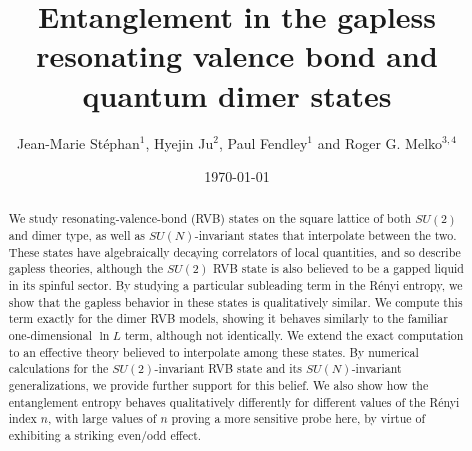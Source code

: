 \documentclass[11pt]{iopart}
\begin{document}
 
\title[Entanglement in RVB and quantum dimer states]{Entanglement in the gapless resonating valence bond and quantum dimer states}
 
\author{Jean-Marie St\'ephan$^1$, Hyejin Ju$^2$, Paul Fendley$^1$ and Roger G. Melko$^{3,4}$}

\address{$^1$ Physics Department, University of Virginia, Charlottesville, VA 22904-4714}

\address{$^2$ Department of Physics, University of California, Santa Barbara, CA, 93106-9530}

\address{$^3$ Department of Physics and Astronomy, University of Waterloo, Ontario, N2L 3G1, Canada}

\address{$^4$ Perimeter Institute for Theoretical Physics, Waterloo, Ontario N2L 2Y5, Canada}



\date{\today}
\begin{abstract}

We study resonating-valence-bond (RVB) states on the square lattice of both $SU(2)$ and dimer type,  as well as $SU(N)$-invariant states that interpolate between the two. These states have algebraically decaying correlators of local quantities, and so describe gapless theories, although the $SU(2)$ RVB state is also believed to be a gapped liquid in its spinful sector. By studying a particular subleading term in the R\'enyi entropy, we show that the gapless behavior in these states is qualitatively similar. We compute this term exactly for the dimer RVB models, showing it behaves similarly to the familiar one-dimensional $\ln L$ term, although not identically. We extend the exact computation to an effective theory believed to interpolate among these states. By numerical calculations for the $SU(2)$-invariant RVB state and its $SU(N)$-invariant generalizations, we provide further support for this belief. We also show how the entanglement entropy behaves qualitatively differently for different values of the 
R\'enyi index $n$, with large values of $n$ proving a more sensitive probe here, by virtue of exhibiting a striking even/odd effect.


\end{abstract}
\maketitle
\end{document}
